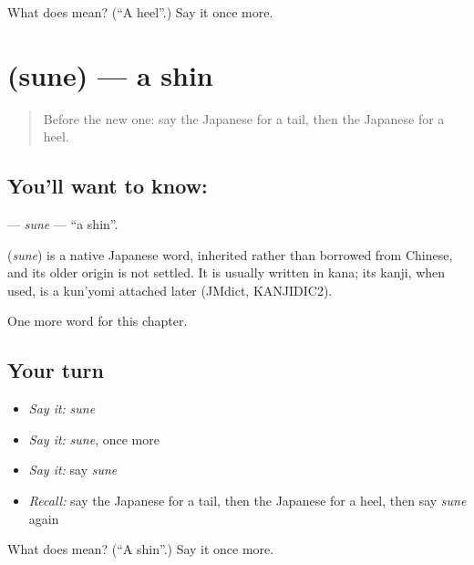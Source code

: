 \begin{tcolorbox}[breakable,colback=teal!4,colframe=teal!35!black,title={Before you move on}]
What does  mean? (\textquotedblleft{}A heel\textquotedblright{}.) Say it once more.
\end{tcolorbox}
\section[\texorpdfstring{\ja{すね} (sune)}{すね (sune)}]{ (sune) — a shin}

\label{lesson:JA-C110-sune}



\begin{quote}
Before the new one: say the Japanese for a tail, then the Japanese for a heel.
\end{quote}

\subsection*{You'll want to know: }
\textbf{} — \emph{sune} — \textquotedblleft{}a shin\textquotedblright{}.

\begin{cousinweb}
\textbf{} (\emph{sune}) is a native Japanese word, inherited rather than borrowed from Chinese, and its older origin is not settled. It is usually written in kana; its kanji, when used, is a kun'yomi attached later (JMdict, KANJIDIC2).
\end{cousinweb}

\begin{grammarlens}[title={What you've built}]
One more word for this chapter.
\end{grammarlens}

\subsection*{Your turn}
\begin{itemize}
\raggedright
  \item \emph{Say it:} \emph{sune}
  \item \emph{Say it:} \emph{sune}, once more
  \item \emph{Say it:} say \emph{sune}
  \item \emph{Recall:} say the Japanese for a tail, then the Japanese for a heel, then say \emph{sune} again
\end{itemize}

\begin{tcolorbox}[breakable,colback=teal!4,colframe=teal!35!black,title={Before you move on}]
What does  mean? (\textquotedblleft{}A shin\textquotedblright{}.) Say it once more.
\end{tcolorbox}
